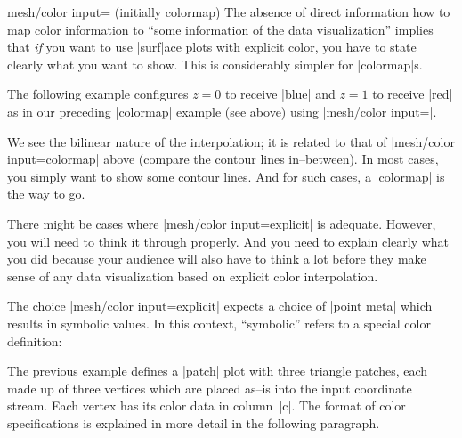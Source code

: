 {{\begin{pgfplotskey}{mesh/color input= (initially colormap)}
The absence of direct information how to map color information to ``some information of the data visualization'' implies that \emph{if} you want to use |surf|ace plots with explicit color, you have to state clearly what you want to show. This is considerably simpler for |colormap|s. 

The following example configures $z=0$ to receive |blue| and $z=1$ to receive |red| as in our preceding |colormap| example (see above) using |mesh/color input=|.
\begin{codeexample}[]
\end{codeexample}
\noindent We see the bilinear nature of the interpolation; it is related to that of |mesh/color input=colormap| above (compare the contour lines in--between). In most cases, you simply want to show some contour lines. And for such cases, a |colormap| is the way to go.

There might be cases where |mesh/color input=explicit| is adequate. However, you will need to think it through properly. And you need to explain clearly what you did because your audience will also have to think a lot before they make sense of any data visualization based on explicit color interpolation.


The choice |mesh/color input=explicit| expects a choice of |point meta| which results in symbolic values. 
In this context, ``symbolic'' refers to a special color definition:
\begin{codeexample}[]
\end{codeexample}
\noindent The previous example defines a |patch| plot with three triangle patches, each made up of three vertices which are placed as--is into the input coordinate stream. Each vertex has its color data in column~|c|. The format of color specifications is explained in more detail in the following paragraph. 


\end{pgfplotskey}}}
